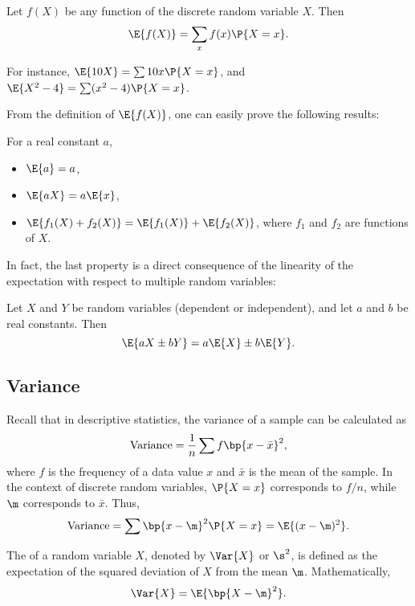 \begin{definition}
    Let $f(X)$ be any function of the discrete random variable $X$. Then \[\E{f(X)} = \sum_{x} f(x) \P{X = x}.\]
\end{definition}

For instance, $\E{10 X} = \sum 10 x \P{X = x}$, and $\E{X^2 - 4} = \sum (x^2 - 4) \P{X = x}$.

From the definition of $\E{f(X)}$, one can easily prove the following results:
\begin{proposition}
    For a real constant $a$,
    \begin{itemize}
        \item $\E{a} = a$,
        \item $\E{aX} = a\E{x}$,
        \item $\E{f_1(X) + f_2(X)} = \E{f_1(X)} + \E{f_2(X)}$, where $f_1$ and $f_2$ are functions of $X$.
    \end{itemize}
\end{proposition}

In fact, the last property is a direct consequence of the linearity of the expectation with respect to multiple random variables:

\begin{proposition}
    Let $X$ and $Y$ be random variables (dependent or independent), and let $a$ and $b$ be real constants. Then \[\E{aX \pm bY} = a\E{X} \pm b\E{Y}.\]
\end{proposition}

\subsection{Variance}\label{ssec:DRV-Var}

Recall that in descriptive statistics, the variance of a sample can be calculated as \[\text{Variance} = \frac1n \sum f\bp{x - \bar x}^2,\] where $f$ is the frequency of a data value $x$ and $\bar x$ is the mean of the sample. In the context of discrete random variables, $\P{X = x}$ corresponds to $f/n$, while $\m$ corresponds to $\bar x$. Thus, \[\text{Variance} = \sum \bp{x - \m}^2 \P{X = x} = \E{(x- \m)^2}.\]

\begin{definition}
    The  of a random variable $X$, denoted by $\Var{X}$ or $\s^2$, is defined as the expectation of the squared deviation of $X$ from the mean $\m$. Mathematically, \[\Var{X} = \E{\bp{X - \m}^2}.\]
\end{definition}

